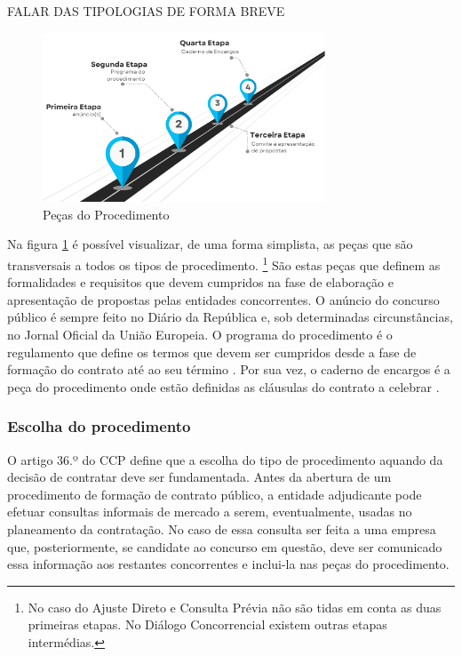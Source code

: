 FALAR DAS TIPOLOGIAS DE FORMA BREVE

\begin{figure}[H]
	\centering
	\includegraphics[width=0.75\textwidth]{imagens/pecasprocedimento.png}
	\caption{Peças do Procedimento}
	\label{fig:pecas}
\end{figure}

Na figura \ref{fig:pecas} é possível visualizar, de uma forma simplista, as peças que são transversais a todos os tipos de procedimento. \footnote{No caso do Ajuste Direto e Consulta Prévia não são tidas em conta as duas primeiras etapas. No Diálogo Concorrencial existem outras etapas intermédias.} 
São estas peças que definem as formalidades e requisitos que devem cumpridos na fase de elaboração e apresentação de propostas pelas entidades concorrentes. 
O anúncio do concurso público é sempre feito no Diário da República e, sob determinadas circunstâncias, no Jornal Oficial da União Europeia. 
O programa do procedimento é o regulamento que define os termos que devem ser cumpridos desde a fase de formação do contrato até ao seu término \cite{programaproc}. 
Por sua vez, o caderno de encargos é a peça do procedimento onde estão definidas as cláusulas do contrato a celebrar \cite{caderno}. 


\subsubsection{Escolha do procedimento}

O artigo 36.º do CCP define que a escolha do tipo de procedimento aquando da decisão de contratar deve ser fundamentada. Antes da abertura de um procedimento de formação de contrato público, a entidade adjudicante pode efetuar consultas informais de mercado a serem, eventualmente, usadas no planeamento da contratação. No caso de essa consulta ser feita a uma empresa que, posteriormente, se candidate ao concurso em questão, deve ser comunicado essa informação aos restantes concorrentes e inclui-la nas peças do procedimento. 

